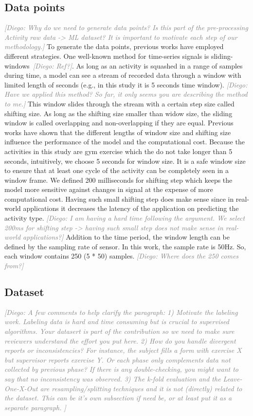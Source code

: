 \documentclass[journal,article,submit,moreauthors,pdftex]{Definitions/mdpi}
\newcommand{\diego}[1]{\textcolor{gray}{{\it [Diego: #1]}}}
\begin{document}
\subsection{Data points}

\diego{Why do we need to generate data points? Is this part of the pre-processing Activity raw data -> ML dataset? It is important to motivate each step of our methodology.}
To generate the data points, previous works have employed different strategies. One well-known method for time-series signals is sliding-windows~\diego{Ref?}. As long as an activity is squashed in a range of samples during time, a model can see a stream of recorded data through a window with limited length of seconds (e.g., in this study it is 5 seconds time window). \diego{Have we applied this method? So far, it only seems you are describing the method to me.} 
This window slides through the stream with a certain step size called shifting size. As long as the shifting size smaller than widow size, the sliding window is called overlapping and non-overlapping if they are equal. Previous works have shown that the different lengths of window size and shifting size influence the performance of the model and the computational cost. Because the activities in this study are gym exercise which the do not take longer than 5 seconds, intuitively, we choose 5 seconds for window size. It is a safe window size to ensure that at least one cycle of the activity can be completely seen in a window frame. We defined 200 milliseconds for shifting step which keeps the model more sensitive against changes in signal at the expense of more computational cost. Having such small shifting step does make sense since in real-world applications it decreases the latency of the application on predicting the activity type. \diego{I am having  a  hard time following the argument. We select 200ms for shifting step -> having such small step does not make sense in real-world applications?} Addition to the time period, the window length can be defined by the sampling rate of sensor. In this work, the sample rate is 50Hz. So, each window contains 250 (5 * 50) samples. \diego{Where does the 250 comes from?}

\subsection{Dataset}

\diego{A few comments to help clarify the paragraph: 
	1) Motivate the labeling work. Labeling data is hard and time consuming but is crucial to supervised algorithms. Your datasert is part of the contribution so we need to make sure reviewers understand the effort you put here.
	2) How do you handle divergent reports or inconsistencies? For instance, the subject fills a form with exercise X but supervisor reports exercise Y. Or each phase only complements data not collected by previous phase? If there is any double-checking, you might want to say that no inconsistency was observed. 
	3) The k-fold evaluation and the Leave-One-X-Out are resampling/splitting techniques and it is not (directly) related to the dataset. This can be it's own subsection if need be, or at least put it as a separate paragraph.
}
\end{document}
